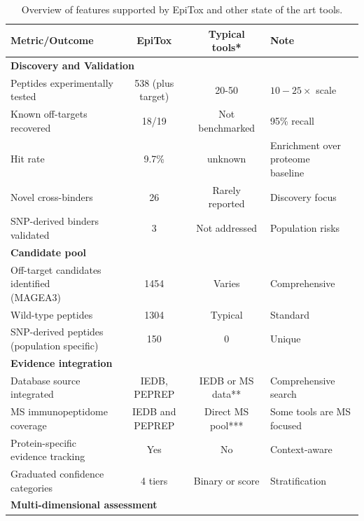 \documentclass[times, twoside, watermark]{zHenriquesLab-StyleBioRxiv}
\begin{document}
        \begin{table}%
        \centering
        \caption{Overview of features supported by EpiTox and other state of the art tools.\label{tab:discussion}}
        \begin{tabular}{@{}l|c|c|l@{}}
            \toprule
            \textbf{Metric/Outcome} & \textbf{EpiTox} & \textbf{Typical tools*} & \textbf{Note} \\
            \midrule
            \multicolumn{4}{l}{\textbf{Discovery and Validation}} \\
            \midrule
            Peptides experimentally tested	& 538 (plus target)	& 20-50	& $10-25 \times$ scale \\
            Known off-targets recovered	& 18/19	& Not benchmarked & 95\% recall \\
            Hit rate	& 9.7\%	& unknown	& \makecell[l]{Enrichment over proteome \\ baseline} \\
            Novel cross-binders &	26	& Rarely reported	& Discovery focus \\
            SNP-derived binders validated	& 3	& Not addressed	& Population risks \\
            \midrule
            \multicolumn{4}{l}{\textbf{Candidate pool}} \\
            \midrule
            \makecell[l]{Off-target candidates identified \\ (MAGEA3)}	& 1454	& Varies	& Comprehensive \\
            Wild-type peptides	& 1304	& Typical	& Standard \\
            \makecell[l]{SNP-derived peptides \\ (population specific)}	& 150	& 0	& Unique \\
            \midrule
            \multicolumn{4}{l}{\textbf{Evidence integration}} \\			
            \midrule
            Database source integrated	& IEDB, PEPREP	& IEDB or MS data**	& Comprehensive search \\
            MS immunopeptidome coverage	& IEDB and PEPREP	& Direct MS pool***	& Some tools are MS focused\\
            Protein-specific evidence tracking &	Yes	& No	& Context-aware \\
            Graduated confidence categories & 4 tiers	& Binary or score	& Stratification \\
            \midrule
            \multicolumn{4}{l}{\textbf{Multi-dimensional assessment}} \\		

\end{tabular}
\end{table}
\end{document}
